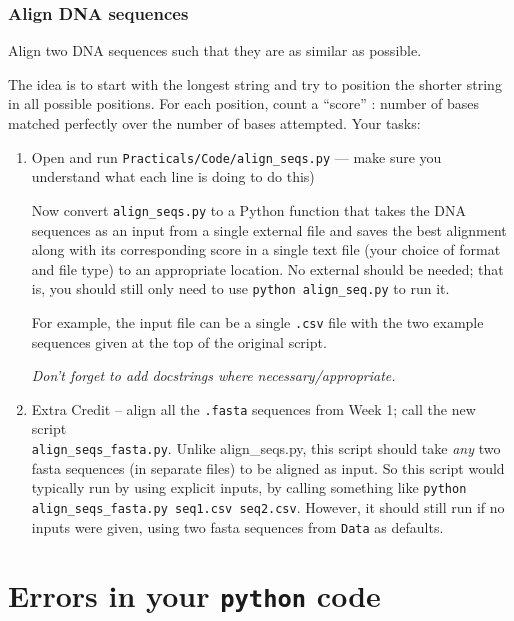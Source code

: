 \subsubsection{Align DNA sequences}

Align two DNA sequences such that they are as similar as possible. 

The idea is to start with the longest string and try to position the 
shorter string in all possible positions. For each position, count a 
``score'' : number of bases matched perfectly over the number of bases 
attempted. Your tasks:

 \begin{enumerate} \itemsep3pt
 
		\item Open and run {\tt Practicals/Code/align\_seqs.py} --- make 
		sure you understand what each line is doing to do this)

		Now convert {\tt align\_seqs.py} to a Python function that 
		takes the DNA sequences as an input from a single external file and 
		saves the best alignment along with its corresponding score in a 
		single text file (your choice of format and file type) to an 
		appropriate location. No external should be needed; that is, you 
		should still only need to use {\tt python align\_seq.py} to run it. 
		
		For example, the input file can be a single {\tt .csv} file 
		with the two example sequences given at the top of the original 
		script.

		{\it Don't forget to add docstrings where necessary/appropriate.} 

		\item Extra Credit -- align all the {\tt .fasta} sequences from 
		Week 1; call the new script \\ {\tt align\_seqs\_fasta.py}. Unlike 
		align\_seqs.py, this script should take {\it any} two fasta sequences (in 
		separate files) to be aligned as input. So this script would 
		typically run by using explicit inputs, by calling something like {\tt python 
		align\_seqs\_fasta.py seq1.csv seq2.csv}. However, it should 
		still run if no inputs were given, using two fasta sequences  
		from {\tt Data} as defaults.

  \end{enumerate}

\section{Errors in your {\tt python} code}

